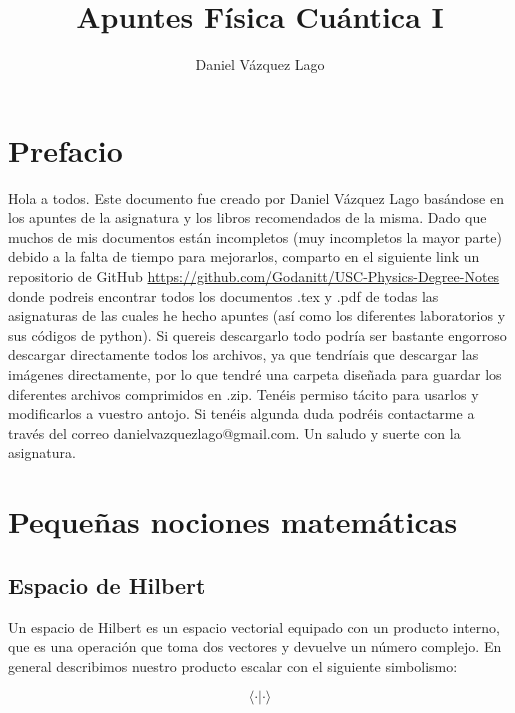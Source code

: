 \documentclass[12pt]{article}
\author{Daniel Vázquez Lago}
\title{Apuntes Física Cuántica I}
\begin{document}
\maketitle

\newpage

\tableofcontents

\newpage

\section*{Prefacio}

Hola a todos. Este documento fue creado por Daniel Vázquez Lago basándose en los apuntes de la asignatura y los libros recomendados de la misma. Dado que muchos de mis documentos están incompletos (muy incompletos la mayor parte) debido a la falta de tiempo para mejorarlos, comparto en el siguiente link un repositorio de GitHub \url{https://github.com/Godanitt/USC-Physics-Degree-Notes} donde podreis encontrar todos los documentos .tex y .pdf de todas las asignaturas de las cuales he hecho apuntes (así como los diferentes laboratorios y sus códigos de python). Si quereis descargarlo todo podría ser bastante engorroso descargar directamente todos los archivos, ya que tendríais que descargar las imágenes directamente, por lo que tendré una carpeta diseñada para guardar los diferentes archivos comprimidos en .zip. Tenéis permiso tácito para usarlos y modificarlos a vuestro antojo. Si tenéis algunda duda podréis contactarme a través del correo danielvazquezlago@gmail.com. Un saludo y suerte con la asignatura.

\newpage

\section{Pequeñas nociones matemáticas}

\subsection{Espacio de Hilbert}

Un espacio de Hilbert es un espacio vectorial equipado con un producto interno, que es una operación que toma dos vectores y devuelve un número complejo. En general describimos nuestro producto escalar con el siguiente simbolismo:

\begin{equation}
\langle \cdot | \cdot \rangle
\end{equation}
\end{document}
